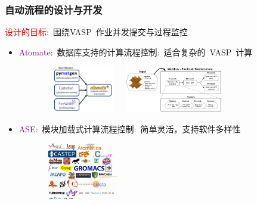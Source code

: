 \documentclass[cjk,slidestop,handout,compress,mathserif,blue]{beamer}	%
\newcommand{\upcite}[1]{\hspace{0ex}\textsuperscript{\cite{#1}}} %
\begin{document}
\frame
{
	\frametitle{自动流程的设计与开发}
	\textcolor{red}{设计的目标}:~围绕\textrm{VASP~}作业并发提交与过程监控
	\begin{itemize}
		\item \textcolor{purple}{\textrm{Atomate}}:~数据库支持的计算流程控制:~适合复杂的\textrm{~VASP~}计算
\begin{figure}[h!]
\centering
\vspace*{-0.1in}
\includegraphics[height=0.8in,width=1.4in,viewport=0 0 820 630,clip]{Figures/Atomate_comp.png}
\hskip 15pt
\includegraphics[height=0.8in]{Figures/bandstructure_wf.png}
\label{Logo_QM-MM}
\end{figure} 
		\item \textcolor{purple}{\textrm{ASE}}:~模块加载式计算流程控制:~简单灵活，支持软件多样性\\
\begin{figure}[h!]
\centering
\vspace*{-0.05in}
\includegraphics[height=1.0in,width=1.4in,viewport=0 0 638 530,clip]{Figures/ASE_calculator.png}
\label{bandstructure_wf}
\end{figure} 
	\end{itemize}
}

\end{document}
